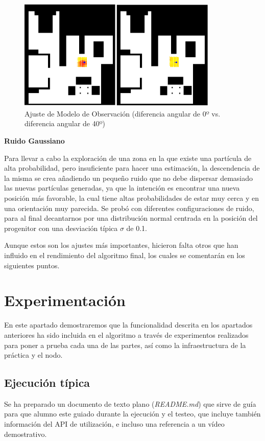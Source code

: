 \begin{figure}[H]
		\begin{center}
		\includegraphics[width=0.85\textwidth]{figures/slidermap.png}
		\caption{Ajuste de Modelo de Observación (diferencia angular de 0º vs. diferencia angular de 40º)}
		\label{fig.slidermap}
		\end{center}
	\end{figure}
	
\textbf{Ruido Gaussiano}
	
Para llevar a cabo la exploración de una zona en la que existe una partícula de alta probabilidad, pero insuficiente para hacer una estimación, la descendencia de la misma se crea añadiendo un pequeño ruido que no debe dispersar demasiado las nuevas partículas generadas, ya que la intención es encontrar una nueva posición más favorable, la cual tiene altas probabilidades de estar muy cerca y en una orientación muy parecida. Se probó con diferentes configuraciones de ruido, para al final decantarnos por una distribución normal centrada en la posición del progenitor con una desviación típica $\sigma$ de 0.1.

Aunque estos son los ajustes más importantes, hicieron falta otros que han influido en el rendimiento del algoritmo final, los cuales se comentarán en los siguientes puntos.

\section{Experimentación}
En este apartado demostraremos que la funcionalidad descrita en los apartados anteriores ha sido incluida en el algoritmo a través de experimentos realizados para poner a prueba cada una de las partes, así como la infraestructura de la práctica y el nodo.

\subsection{Ejecución típica}
Se ha preparado un documento de texto plano (\textit{README.md}) que sirve de guía para que alumno este guiado durante la ejecución y el testeo, que incluye también información del API de utilización, e incluso una referencia a un vídeo demostrativo. 

